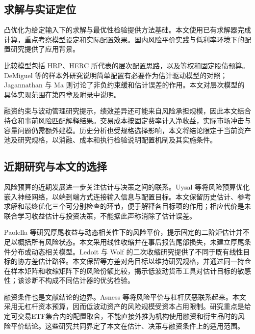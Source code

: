 \subsection{求解与实证定位}
\label{sec:literature_empirical}
凸优化为给定输入下的求解与最优性检验提供方法基础\cite{boyd2004convex}。本文使用已有求解器完成计算，重点考察模型设定和实际配置效果。国内风险平价实践与低利率环境下的配置研究提供了应用背景\cite{htsc2024practice,htsc2025lowrate}。

比较模型包括 HRP、HERC 所代表的层次配置思路\cite{lopezdeprado2016building,raffinot2018hierarchical}，以及等权和固定股债预算。DeMiguel 等的样本外研究说明简单配置有必要作为估计驱动模型的对照\cite{demiguel2009optimal}；Jagannathan 与 Ma 则讨论了非负约束缓和估计误差的作用\cite{jagannathan2003risk}。本文对层次模型的具体实现范围在第四章及附录中说明。

融资约束与波动管理研究提示，绩效差异还可能来自风险承担规模\cite{frazzini2014betting,moreira2017volatility}，因此本文结合持仓和事前风险匹配解释结果。交易成本按固定费率计入净收益，实际市场冲击与容量问题仍需额外建模\cite{almgren2001optimal}。历史分析也受规格选择影响\cite{white2000reality,bailey2014probability,bailey2017pbo}，本文将结论限定于当前资产池及研究规格，以消融、成本和执行检验说明配置机制及其实施条件。

\subsection{近期研究与本文的选择}
风险预算的近期发展进一步关注估计与决策之间的联系。Uysal 等将风险预算优化嵌入神经网络，以端到端方式连接输入信息与配置目标\cite{uysal2024endtoend}。本文保留历史估计、参考求解和最终优化三个可分别检查的环节，便于解释各目标项的作用；相应代价是未联合学习收益估计与投资决策，不能据此声称消除了估计误差。

Paolella 等研究厚尾收益与动态相关性下的风险平价\cite{paolella2025riskparity}，提示固定的二阶矩估计并不足以概括所有风险状态。本文采用线性收缩并在事后报告尾部损失，未建立厚尾条件分布或动态相关模型。Ledoit 与 Wolf 的二次收缩研究提供了不同于既有线性目标的协方差估计路径\cite{ledoit2022quadratic}。本文保留等方差对角目标以维持研究规格，并通过同一持仓在样本矩阵和收缩矩阵下的风险份额比较，揭示低波动货币工具对估计目标的敏感性；该诊断不构成不同估计器的优劣检验。

融资条件也是文献结论的边界。Asness 等将风险平价与杠杆厌恶联系起来\cite{asness2012leverage}。本文采用无杠杆资本预算，因而低波动资产的风险规模受资本占用限制。研究重点是给定可交易ETF集合内的配置取舍，不能直接外推为机构使用融资和衍生品时的风险平价结论。这些研究共同界定了本文在估计、决策与融资条件上的适用范围。

